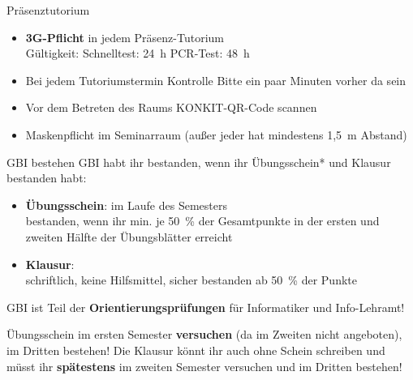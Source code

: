 
\begin{frame}[t]{Präsenztutorium}
	\begin{itemize}
		\item \textbf{3G-Pflicht} in jedem Präsenz-Tutorium \\
			Gültigkeit: \quad Schnelltest: 24~h \quad PCR-Test: 48~h
		\pause
		\item Bei jedem Tutoriumstermin Kontrolle 
		\implitem Bitte ein paar Minuten vorher da sein
		\item Vor dem Betreten des Raums KONKIT-QR-Code scannen
		\pause
		\item Maskenpflicht im Seminarraum (außer jeder hat mindestens 1,5~m Abstand)
	\end{itemize}
\end{frame}


\begin{frame}[t]{GBI bestehen}
	GBI habt ihr bestanden, wenn ihr Übungsschein* und Klausur bestanden habt:
	\begin{itemize}
		\item \textbf{Übungsschein}: im Laufe des Semesters \\
			  bestanden, wenn ihr min. je 50~\% der Gesamtpunkte in der ersten und zweiten Hälfte der Übungsblätter erreicht \\

		\item \textbf{Klausur}: \Klausurtermin \\
			  schriftlich, keine Hilfsmittel, sicher bestanden ab 50~\% der Punkte
	\end{itemize}
	\pause
	\pause
	GBI ist Teil der \textbf{Orientierungsprüfungen} für Informatiker und Info-Lehramt!
	\begin{itemize}
		\implitem Übungsschein im ersten Semester \textbf{versuchen} (da im Zweiten nicht angeboten), im Dritten bestehen! 
		\implitem Die Klausur könnt ihr auch ohne Schein schreiben und müsst ihr \textbf{spätestens} im zweiten Semester versuchen und im Dritten bestehen!
	\end{itemize}
\end{frame}

